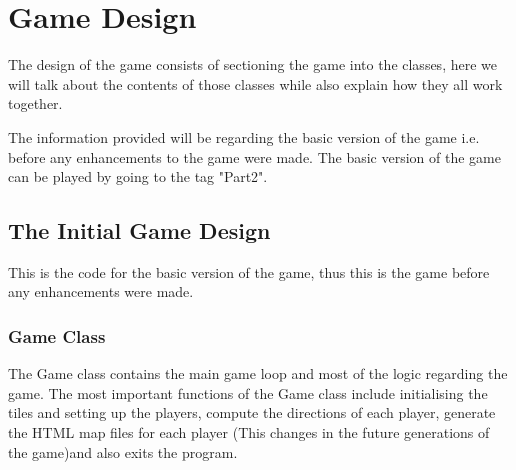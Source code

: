 \documentclass[a4paper,12pt]{extarticle}
\begin{document}
\section{Game Design}
The design of the game consists of sectioning the game into the classes, here we will talk about the contents of those classes while also explain how they all work together.

The information provided will be regarding the basic version of the game i.e. before any enhancements to the game were made. The basic version of the game can be played by going to the tag "Part2".

\subsection{The Initial Game Design}
This is the code for the basic version of the game, thus this is the game before any enhancements were made.

\subsubsection{Game Class}
The Game class contains the main game loop and most of the logic regarding the game. The most important functions of the Game class include initialising the tiles and setting up the players, compute the directions of each player, generate the HTML map files for each player (This changes in the future generations of the game)and also exits the program.
\end{document}

